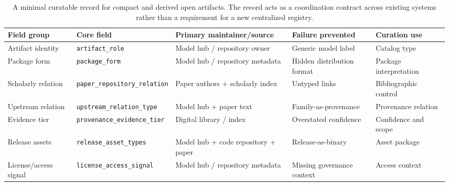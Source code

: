 \begin{table}[!tbp]
\centering
\caption{A minimal curatable record for compact and derived open \llm artifacts. The record acts as a coordination contract across existing systems rather than a requirement for a new centralized registry.}
\label{tab:minimal-curatable-record}
\small
\setlength{\tabcolsep}{4pt}
\renewcommand{\arraystretch}{1.12}
\begin{tabularx}{0.98\textwidth}{@{}p{}p{}p{}p{}Y@{}}
\toprule
Field group & Core field & Primary maintainer/source & Failure prevented & Curation use \\
\midrule
Artifact identity & \texttt{artifact\_role} & Model hub / repository owner & Generic model label & Catalog type \\
Package form & \texttt{package\_form} & Model hub / repository metadata & Hidden distribution format & Package interpretation \\
Scholarly relation & \texttt{paper\_repository\_relation} & Paper authors + scholarly index & Untyped links & Bibliographic control \\
Upstream relation & \texttt{upstream\_relation\_type} & Model hub + paper text & Family-as-provenance & Provenance relation \\
Evidence tier & \texttt{provenance\_evidence\_tier} & Digital library / index & Overstated confidence & Confidence and scope \\
Release assets & \texttt{release\_asset\_types} & Model hub + code repository + paper & Release-as-binary & Asset package \\
License/access signal & \texttt{license\_access\_signal} & Model hub / repository metadata & Missing governance context & Access context \\
\bottomrule
\end{tabularx}
\renewcommand{\arraystretch}{1.0}
\end{table}
